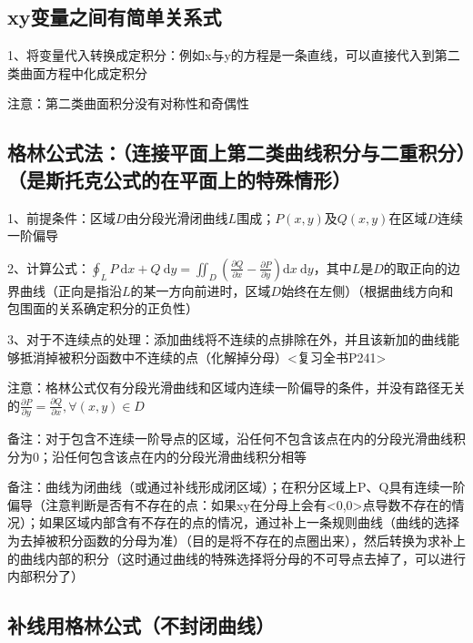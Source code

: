 \subsection{xy变量之间有简单关系式}

1、将变量代入转换成定积分：例如x与y的方程是一条直线，可以直接代入到第二类曲面方程中化成定积分

注意：第二类曲面积分没有对称性和奇偶性



\subsection{格林公式法：（连接平面上第二类曲线积分与二重积分）（是斯托克公式的在平面上的特殊情形）}

1、前提条件：区域$D$由分段光滑闭曲线$L$围成；$P(x, y)$及$Q(x, y)$在区域$D$连续一阶偏导

2、计算公式：$\oint_{L} P \mathrm{~d} x+Q \mathrm{~d} y=\iint_{D}\left(\frac{\partial Q}{\partial x}-\frac{\partial P}{\partial y}\right) \mathrm{d} x \mathrm{~d} y$，其中$L$是$D$的取正向的边界曲线（正向是指沿$L$的某一方向前进时，区域$D$始终在左侧）（根据曲线方向和包围面的关系确定积分的正负性）

3、对于不连续点的处理：添加曲线将不连续的点排除在外，并且该新加的曲线能够抵消掉被积分函数中不连续的点（化解掉分母）<复习全书P241>

注意：格林公式仅有分段光滑曲线和区域内连续一阶偏导的条件，并没有路径无关的$\frac{\partial P}{\partial y}=\frac{\partial Q}{\partial x}, \forall(x, y) \in D$

备注：对于包含不连续一阶导点的区域，沿任何不包含该点在内的分段光滑曲线积分为0；沿任何包含该点在内的分段光滑曲线积分相等

备注：曲线为闭曲线（或通过补线形成闭区域）；在积分区域上P、Q具有连续一阶偏导（注意判断是否有不存在的点：如果xy在分母上会有<0,0>点导数不存在的情况）；如果区域内部含有不存在的点的情况，通过补上一条规则曲线（曲线的选择为去掉被积分函数的分母为准）（目的是将不存在的点圈出来），然后转换为求补上的曲线内部的积分（这时通过曲线的特殊选择将分母的不可导点去掉了，可以进行内部积分了）



\subsection{补线用格林公式（不封闭曲线）}

